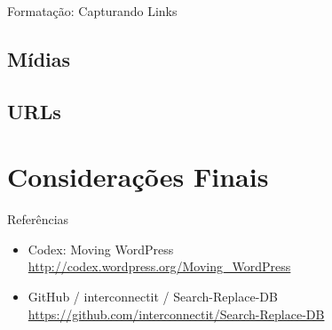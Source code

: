 \documentclass{beamer}
\begin{document}
\begin{frame}{Formatação: Capturando Links}
  
\end{frame}


\subsection{Mídias}

\begin{frame}
\end{frame}


\subsection{URLs}

\begin{frame}
\end{frame}


\section{Considerações Finais}

\begin{frame}{Referências}
\begin{itemize}
  \footnotesize
  \item Codex: Moving WordPress \\
        \url{http://codex.wordpress.org/Moving_WordPress}
  \item GitHub / interconnectit / Search-Replace-DB \\
        \url{https://github.com/interconnectit/Search-Replace-DB}
\end{itemize}
\end{frame}
\end{document}
